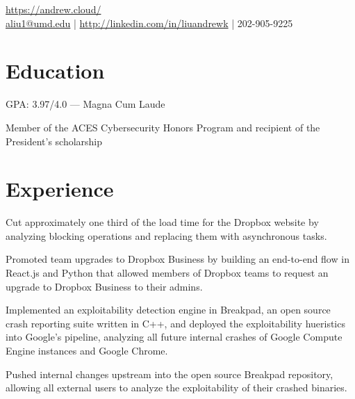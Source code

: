 \documentclass[]{template}
\begin{document}
\lastupdated

{
  \url{https://andrew.cloud/} \\
  \href{mailto:aliu1@umd.edu}{aliu1@umd.edu} | \href{https://linkedin.com/in/liuandrewk}{http://linkedin.com/in/liuandrewk} | 202-905-9225
}

\section{Education}
\begin{tightemize}
\item GPA: 3.97/4.0 --- Magna Cum Laude
\item Member of the ACES Cybersecurity Honors Program and recipient of the President's scholarship
\end{tightemize}
\sectionsep

\section{Experience}

\sectionsep

\begin{tightemize}
\item Cut approximately one third of the load time for the Dropbox website by analyzing blocking operations and replacing them with asynchronous tasks.
\item Promoted team upgrades to Dropbox Business by building an end-to-end flow in React.js and Python that allowed members of Dropbox teams to request an upgrade to Dropbox Business to their admins.
\end{tightemize}
\sectionsep

\begin{tightemize}
\item Implemented an exploitability detection engine in Breakpad, an open source crash reporting suite written in C++, and deployed the exploitability hueristics into Google's pipeline, analyzing all future internal crashes of Google Compute Engine instances and Google Chrome.
\item Pushed internal changes upstream into the open source Breakpad repository, allowing all external users to analyze the exploitability of their crashed binaries.
\end{tightemize}
\sectionsep
\end{document}
